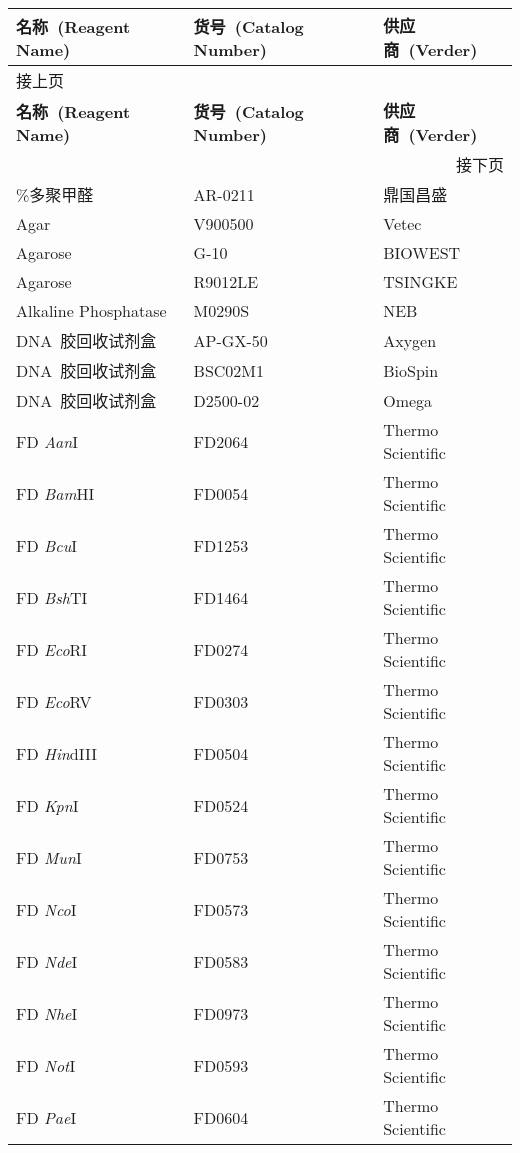 \begin{longtable}{lll @{}}
\toprule
\textbf{名称\ (Reagent Name)} & \textbf{货号\ (Catalog Number)} & \textbf{供应商\ (Verder)}\\
\midrule
\endfirsthead
\multicolumn{3}{l}{\footnotesize 接上页}\\
\toprule
\textbf{名称\ (Reagent Name)} & \textbf{货号\ (Catalog Number)} & \textbf{供应商\ (Verder)}\\
\midrule
\endhead
\hline
\multicolumn{3}{r}{\footnotesize 接下页}\\
\endfoot
\endlastfoot
4\%多聚甲醛         &   AR-0211 &   鼎国昌盛\\
Agar                &   V900500 &   Vetec   \\
Agarose             &   G-10    &   BIOWEST\\
Agarose             &   R9012LE &   TSINGKE \\
Alkaline Phosphatase	&	M0290S	&	NEB \\
DNA\ 胶回收试剂盒   &   AP-GX-50&   Axygen             \\
DNA\ 胶回收试剂盒   &   BSC02M1 &   BioSpin             \\
DNA\ 胶回收试剂盒   &   D2500-02&   Omega               \\
FD \textit{Aan}I	&	FD2064	&	Thermo Scientific	\\
FD \textit{Bam}HI	&	FD0054	&	Thermo Scientific	\\
FD \textit{Bcu}I	&	FD1253	&	Thermo Scientific	\\
FD \textit{Bsh}TI	&	FD1464	&	Thermo Scientific	\\
FD \textit{Eco}RI	&	FD0274	&	Thermo Scientific	\\
FD \textit{Eco}RV	&	FD0303	&	Thermo Scientific	\\
FD \textit{Hin}dIII	&	FD0504	&	Thermo Scientific	\\
FD \textit{Kpn}I	&	FD0524	&	Thermo Scientific	\\
FD \textit{Mun}I	&	FD0753	&	Thermo Scientific	\\
FD \textit{Nco}I	&	FD0573	&	Thermo Scientific	\\
FD \textit{Nde}I	&	FD0583	&	Thermo Scientific	\\
FD \textit{Nhe}I	&	FD0973	&	Thermo Scientific	\\
FD \textit{Not}I	&	FD0593	&	Thermo Scientific	\\
FD \textit{Pae}I	&	FD0604	&	Thermo Scientific	\\

\end{longtable}
